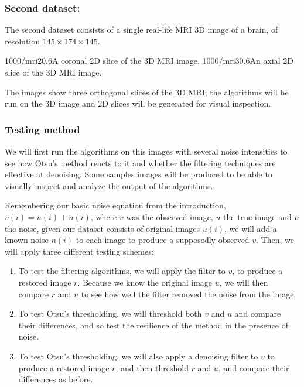 \subsubsection*{Second dataset:} The second dataset consists of a single real-life MRI 3D image of a brain, of resolution $145 \times 174 \times 145$.

{1000/mri2}{0.6}{A coronal 2D slice of the 3D MRI image.}
{1000/mri3}{0.6}{An axial 2D slice of the 3D MRI image.}

The images show three orthogonal slices of the 3D MRI; the algorithms will be run on the 3D image and 2D slices will be generated for visual inspection.

\subsubsection*{Testing method}

We will first run the algorithms on this images with several noise intensities to see how Otsu's method reacts to it and whether the filtering techniques are effective at denoising. Some samples images will be produced to be able to visually inspect and analyze the output of the algorithms.

Remembering our basic noise equation from the introduction, $v(i) = u(i)+n(i)$, where $v$ was the observed image, $u$ the true image and $n$ the noise, given our dataset consists of original images $u(i)$, we will add a known noise $n(i)$ to each image to produce a supposedly observed $v$. Then, we will apply three different testing schemes:

\begin{enumerate}

\item To test the filtering algorithms, we will apply the filter to $v$, to produce a restored image $r$. Because we know the original image $u$, we will then compare $r$ and $u$ to see how well the filter removed the noise from the image.


\item To test Otsu's thresholding, we will threshold both $v$ and $u$ and compare their differences, and so test the resilience of the method in the presence of noise.


\item To test Otsu's thresholding, we will also apply a denoising filter to $v$ to produce a restored image $r$, and then threshold $r$ and $u$, and compare their differences as before.



\end{enumerate}


